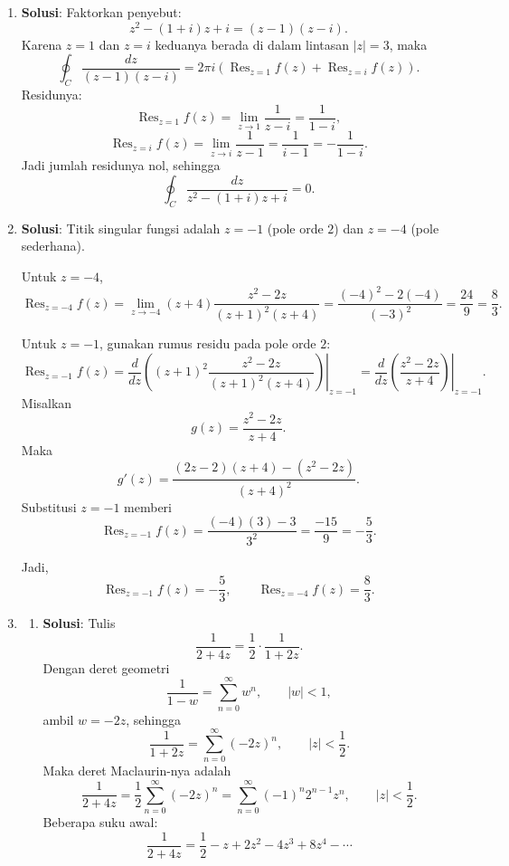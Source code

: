 \documentclass[11pt,letterpaper]{article}
\newcommand{\jawab}{\textbf{Solusi}:}
\begin{document}
\begin{enumerate}
  \item \jawab
        Faktorkan penyebut:
        \[
          z^2 - (1+i)z + i = (z-1)(z-i).
        \]
        Karena $z=1$ dan $z=i$ keduanya berada di dalam lintasan $|z|=3$, maka
        \[
          \oint_C \frac{dz}{(z-1)(z-i)}
          = 2\pi i \left( \operatorname{Res}_{z=1} f(z) + \operatorname{Res}_{z=i} f(z) \right).
        \]
        Residunya:
        \[
          \operatorname{Res}_{z=1} f(z) = \lim_{z \to 1} \frac{1}{z-i} = \frac{1}{1-i},
        \]
        \[
          \operatorname{Res}_{z=i} f(z) = \lim_{z \to i} \frac{1}{z-1} = \frac{1}{i-1} = -\frac{1}{1-i}.
        \]
        Jadi jumlah residunya nol, sehingga
        \[
          \oint_C \frac{dz}{z^2 - (1+i)z + i} = 0.
        \]

  \item \jawab
        Titik singular fungsi adalah $z=-1$ (pole orde $2$) dan $z=-4$ (pole sederhana).

        Untuk $z=-4$,
        \[
          \operatorname{Res}_{z=-4} f(z)
          = \lim_{z \to -4} (z+4)\frac{z^2-2z}{(z+1)^2(z+4)}
          = \frac{(-4)^2 - 2(-4)}{(-3)^2}
          = \frac{24}{9}
          = \frac{8}{3}.
        \]

        Untuk $z=-1$, gunakan rumus residu pada pole orde $2$:
        \[
          \operatorname{Res}_{z=-1} f(z)
          = \left.\frac{d}{dz}\left((z+1)^2 \frac{z^2-2z}{(z+1)^2(z+4)}\right)\right|_{z=-1}
          = \left.\frac{d}{dz}\left(\frac{z^2-2z}{z+4}\right)\right|_{z=-1}.
        \]
        Misalkan
        \[
          g(z) = \frac{z^2-2z}{z+4}.
        \]
        Maka
        \[
          g'(z) = \frac{(2z-2)(z+4) - (z^2-2z)}{(z+4)^2}.
        \]
        Substitusi $z=-1$ memberi
        \[
          \operatorname{Res}_{z=-1} f(z)
          = \frac{(-4)(3) - 3}{3^2}
          = \frac{-15}{9}
          = -\frac{5}{3}.
        \]

        Jadi,
        \[
          \operatorname{Res}_{z=-1} f(z) = -\frac{5}{3},
          \qquad
          \operatorname{Res}_{z=-4} f(z) = \frac{8}{3}.
        \]

  \item
        \begin{enumerate}[label=\alph*)]
          \item \jawab
                Tulis
                \[
                  \frac{1}{2+4z} = \frac{1}{2}\cdot \frac{1}{1+2z}.
                \]
                Dengan deret geometri
                \[
                  \frac{1}{1-w} = \sum_{n=0}^{\infty} w^n, \qquad |w|<1,
                \]
                ambil $w=-2z$, sehingga
                \[
                  \frac{1}{1+2z} = \sum_{n=0}^{\infty} (-2z)^n, \qquad |z| < \frac{1}{2}.
                \]
                Maka deret Maclaurin-nya adalah
                \[
                  \frac{1}{2+4z}
                  = \frac{1}{2}\sum_{n=0}^{\infty} (-2z)^n
                  = \sum_{n=0}^{\infty} (-1)^n 2^{n-1} z^n,
                  \qquad |z| < \frac{1}{2}.
                \]
                Beberapa suku awal:
                \[
                  \frac{1}{2+4z} = \frac{1}{2} - z + 2z^2 - 4z^3 + 8z^4 - \cdots
                \]


\end{enumerate}
\end{enumerate}
\end{document}
